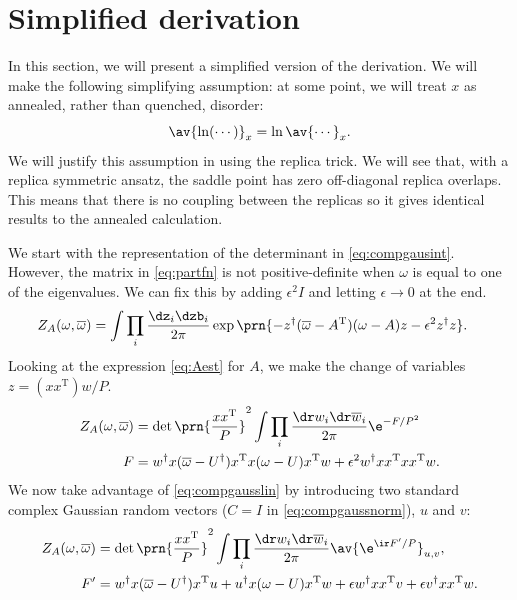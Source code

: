 \documentclass[12pt]{article}
\newcommand{\inv}{^{-1}}
\newcommand{\dg}{^\dagger}
\newcommand{\trans}{^\mathrm{T}}
\newcommand{\omb}{\overline{\omega}}
\newcommand{\dw}{\dr w}
\newcommand{\dwb}{\dr\overline{w}}
\begin{document}
\section{Simplified derivation}\label{sec:simplederiv}

In this section, we will present a simplified version of the derivation.
We will make the following simplifying assumption: at some point, we will treat $x$ as annealed, rather than quenched, disorder:
%
\begin{equation}\label{eq:annealed}
  \av{\ln (\cdots)}_x = \ln\av{\cdots}_x.
\end{equation}
%
We will justify this assumption in  using the replica trick.
We will see that, with a replica symmetric ansatz, the saddle point has zero off-diagonal replica overlaps.
This means that there is no coupling between the replicas so it gives identical results to the annealed calculation.

We start with the representation of the determinant in \eqref{eq:compgausint}.
However, the matrix in \eqref{eq:partfn} is not positive-definite when $\omega$ is equal to one of the eigenvalues.
We can fix this by adding $\epsilon^2I$ and letting $\epsilon\to0$ at the end.
%
\begin{equation}\label{eq:partfnintz}
\begin{aligned}
  Z_A(\omega,\omb) &= \int \prod_i\frac{\dz_i\dzb_i}{2\pi} \exp\prn{
    -z\dg (\omb-A\trans)(\omega-A) z - \epsilon^2 z\dg z} .%
\end{aligned}
\end{equation}
%
Looking at the expression \eqref{eq:Aest} for $A$, we make the change of variables $z=(xx\trans)w/P$.
%
\begin{equation}\label{eq:partfnintw}
\begin{aligned}
  Z_A(\omega,\omb) &= \det\prn{\frac{xx\trans}{P}}^2 \int \prod_i\frac{\dw_i\dwb_i}{2\pi}\e^{-F/P^2}
    \\
  F &=
     w\dg x(\omb-U\dg)x\trans x(\omega-U)x\trans w + \epsilon^2 w\dg xx\trans xx\trans w .%
\end{aligned}
\end{equation}
%
We now take advantage of \eqref{eq:compgausslin} by introducing two standard complex Gaussian random vectors ($C=I$ in \eqref{eq:compgaussnorm}), $u$ and $v$:
%
\begin{equation}\label{eq:partfnintwuv}
\begin{aligned}
  Z_A(\omega,\omb) &= \det\prn{\frac{xx\trans}{P}}^2 \int \prod_i\frac{\dw_i\dwb_i}{2\pi} \av{\e^{\ir F'/P}}_{u,v},\\
  F' &=
    w\dg x(\omb-U\dg)x\trans u + u\dg x(\omega-U)x\trans w + \epsilon w\dg xx\trans v + \epsilon v\dg xx\trans w .%
\end{aligned}
\end{equation}
%
\end{document}
